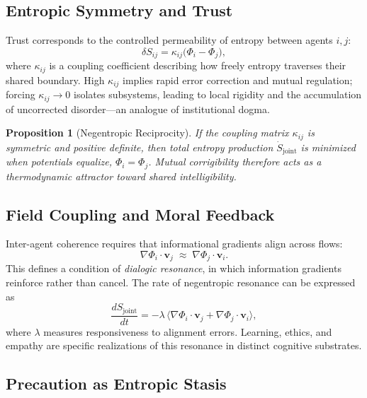 \documentclass[12pt]{article}
\newtheorem{proposition}{Proposition}
\begin{document}
\subsection*{Entropic Symmetry and Trust}

Trust corresponds to the controlled permeability of entropy between agents \(i,j\):
\begin{equation}
\delta S_{ij} = \kappa_{ij}\big(\Phi_i - \Phi_j\big),
\end{equation}
where \(\kappa_{ij}\) is a coupling coefficient describing how freely entropy traverses their shared boundary. High \(\kappa_{ij}\) implies rapid error correction and mutual regulation; forcing \(\kappa_{ij} \to 0\) isolates subsystems, leading to local rigidity and the accumulation of uncorrected disorder—an analogue of institutional dogma.

\begin{proposition}[Negentropic Reciprocity]
If the coupling matrix \(\kappa_{ij}\) is symmetric and positive definite, then total entropy production \(\dot S_{\text{joint}}\) is minimized when potentials equalize, \(\Phi_i = \Phi_j\). Mutual corrigibility therefore acts as a thermodynamic attractor toward shared intelligibility.
\end{proposition}

\subsection*{Field Coupling and Moral Feedback}

Inter-agent coherence requires that informational gradients align across flows:
\begin{equation}
\nabla\Phi_i\cdot \mathbf{v}_j \;\approx\; \nabla\Phi_j\cdot \mathbf{v}_i.
\end{equation}
This defines a condition of \emph{dialogic resonance}, in which information gradients reinforce rather than cancel. The rate of negentropic resonance can be expressed as
\begin{equation}
\frac{dS_{\text{joint}}}{dt} = -\lambda\,\langle \nabla\Phi_i\cdot \mathbf{v}_j + \nabla\Phi_j\cdot \mathbf{v}_i\rangle,
\end{equation}
where \(\lambda\) measures responsiveness to alignment errors. Learning, ethics, and empathy are specific realizations of this resonance in distinct cognitive substrates.

\subsection*{Precaution as Entropic Stasis}
\end{document}
